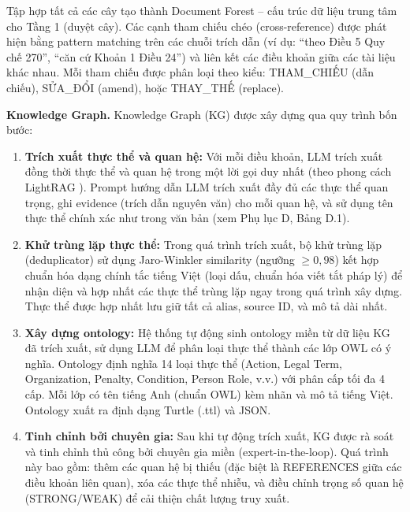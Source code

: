 Tập hợp tất cả các cây tạo thành Document Forest -- cấu trúc dữ liệu trung tâm
cho Tầng 1 (duyệt cây). Các cạnh tham chiếu chéo (cross-reference) được phát hiện
bằng pattern matching trên các chuỗi trích dẫn (ví dụ: ``theo Điều 5 Quy chế
270'', ``căn cứ Khoản 1 Điều 24'') và liên kết các điều khoản giữa các tài liệu
khác nhau. Mỗi tham chiếu được phân loại theo kiểu: THAM\_CHIẾU (dẫn chiếu),
SỬA\_ĐỔI (amend), hoặc THAY\_THẾ (replace).

\textbf{Knowledge Graph.}
Knowledge Graph (KG) được xây dựng qua quy trình bốn bước:

\begin{enumerate}
  \item \textbf{Trích xuất thực thể và quan hệ:} Với mỗi điều khoản, LLM trích
        xuất đồng thời thực thể và quan hệ trong một lời gọi duy nhất (theo phong
        cách LightRAG \cite{guo2025lightrag}). Prompt hướng dẫn LLM trích xuất
        đầy đủ các thực thể quan trọng, ghi evidence (trích dẫn nguyên văn) cho
        mỗi quan hệ, và sử dụng tên thực thể chính xác như trong văn bản (xem Phụ
        lục D, Bảng D.1).

  \item \textbf{Khử trùng lặp thực thể:} Trong quá trình trích xuất, bộ khử trùng
        lặp (deduplicator) sử dụng Jaro-Winkler similarity (ngưỡng $\geq 0{,}98$)
        kết hợp chuẩn hóa dạng chính tắc tiếng Việt (loại dấu, chuẩn hóa viết tắt
        pháp lý) để nhận diện và hợp nhất các thực thể trùng lặp ngay trong quá
        trình xây dựng. Thực thể được hợp nhất lưu giữ tất cả alias, source ID, và
        mô tả dài nhất.

  \item \textbf{Xây dựng ontology:} Hệ thống tự động sinh ontology miền từ dữ
        liệu KG đã trích xuất, sử dụng LLM để phân loại thực thể thành các lớp OWL
        có ý nghĩa. Ontology định nghĩa 14 loại thực thể (Action, Legal Term,
        Organization, Penalty, Condition, Person Role, v.v.) với phân cấp tối đa 4
        cấp. Mỗi lớp có tên tiếng Anh (chuẩn OWL) kèm nhãn và mô tả tiếng Việt.
        Ontology xuất ra định dạng Turtle (.ttl) và JSON.

  \item \textbf{Tinh chỉnh bởi chuyên gia:} Sau khi tự động trích xuất, KG được
        rà soát và tinh chỉnh thủ công bởi chuyên gia miền (expert-in-the-loop).
        Quá trình này bao gồm: thêm các quan hệ bị thiếu (đặc biệt là REFERENCES
        giữa các điều khoản liên quan), xóa các thực thể nhiễu, và điều chỉnh
        trọng số quan hệ (STRONG/WEAK) để cải thiện chất lượng truy xuất.
\end{enumerate}

